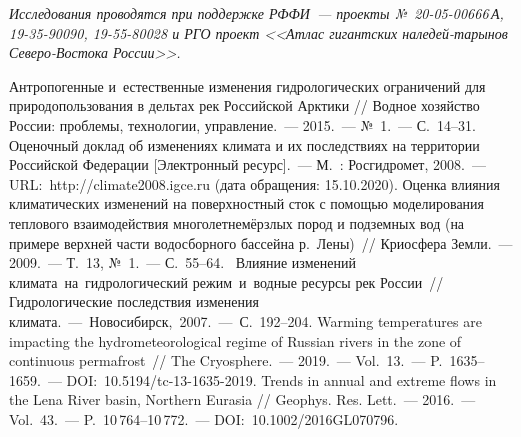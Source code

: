 \textit{Исследования проводятся при поддержке РФФИ~--- проекты №~20-05-00666\,А, 19-35-90090, 19-55-80028 и РГО проект <<Атлас гигантских наледей-тарынов Северо-Востока России>>.}

\begin{thebibliography}{99}
\bibitem{} Антропогенные и~естественные изменения гидрологических ограничений для природопользования в дельтах рек Российской Арктики // Водное хозяйство России: проблемы, технологии, управление.~--- 2015.~--- №~1.~--- С.~14--31.
\bibitem{}Оценочный доклад об изменениях климата и их последствиях на территории Российской Федерации [Электронный ресурс].~--- М.~: Росгидромет, 2008.~--- URL:~http://climate2008.igce.ru (дата обращения: 15.10.2020).
\bibitem{} Оценка влияния климатических изменений на поверхностный сток с помощью моделирования теплового взаимодействия многолетне\-мёрзлых пород и подземных вод (на примере верхней части водосборного бассейна р.~Лены)~// Криосфера Земли.~--- 2009.~--- Т.~13, №~1.~--- С.~55--64.
\bibitem{} Влияние изменений климата на гидрологический режим и водные ресурсы рек России~// Гидрологические последствия изменения климата.~--- Новосибирск, 2007.~--- С.~192--204.
\bibitem{} Warming temperatures are impacting the hydrometeorological regime of Russian rivers in the zone of continuous permafrost~// The Cryosphere.~--- 2019.~--- Vol.~13.~--- P.~1635--1659.~--- DOI:~10.5194/tc-13-1635-2019.
\bibitem{} Trends in annual and extreme flows in the Lena River basin, Northern Eurasia // Geophys. Res. Lett.~--- 2016.~--- Vol.~43.~--- P.~10\,764--10\,772.~--- DOI:~10.1002/2016GL070796.

\end{thebibliography}
